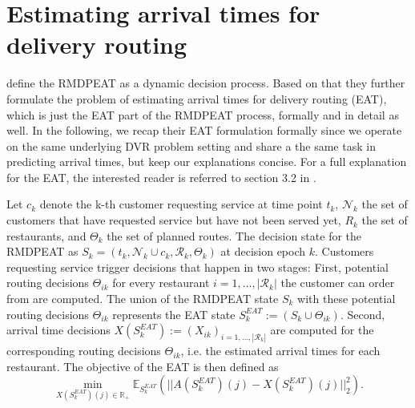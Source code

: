 \section{Estimating arrival times for delivery routing}

\cite{Hildebrandt2020_EAT} define the RMDPEAT as a dynamic decision process. Based on that they further formulate the problem of estimating arrival times for delivery routing (EAT), which is just the EAT part of the RMDPEAT process, formally and in detail as well. In the following, we recap their EAT formulation formally since we operate on the same underlying DVR problem setting and share a the same task in predicting arrival times, but keep our explanations concise. For a full explanation for the EAT, the interested reader is referred to section 3.2 in \cite{Hildebrandt2020_EAT}. 

Let $ c_k $ denote the k-th customer requesting service at time point $ t_k $, $ \mathcal{N}_k $ the set of customers that have requested service but have not been served yet, $ R_k $ the set of restaurants, and $ \Theta_k $ the set of planned routes. The decision state for the RMDPEAT as $ S_k = (t_k, \mathcal{N}_k \cup c_k, \mathcal{R}_k, \Theta_k) $ at decision epoch $ k $. Customers requesting service trigger decisions that happen in two stages: First, potential routing decisions $ \Theta_{ik} $ for every restaurant $ i = 1, \dots, |\mathcal{R}_k| $ the customer can order from are computed. The union of the RMDPEAT state $ S_k $ with these potential routing decisions $ \Theta_{ik} $ represents the EAT state $ S^{EAT}_k := (S_k \cup \Theta_{ik})$. Second, arrival time decisions $ X(S^{EAT}_k) := (X_{ik})_{i = 1, \dots, |\mathcal{R}_k|}$ are computed for the corresponding routing decisions $ \Theta_{ik} $, i.e. the estimated arrival times for each restaurant. The objective of the EAT is then defined as
\begin{equation}
	\min_{X(S^{EAT}_k)(j) \in \mathbb{R}_+} 
	\mathbb{E}_{S^{EAT}_{k}} 
	(|| A(S^{EAT}_{k})(j) - X(S^{EAT}_{k})(j)||^{2}_{2}).
\end{equation}

